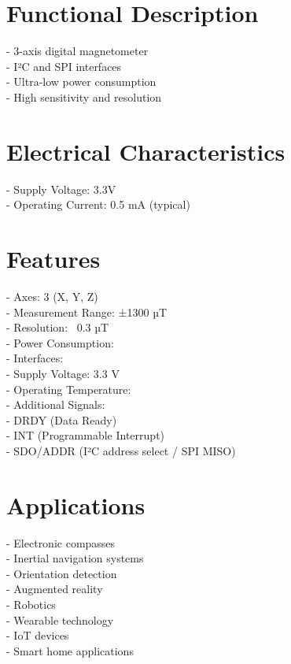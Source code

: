 \documentclass[10pt]{article}
\begin{document}
\section*{Functional Description}
-  3-axis digital magnetometer\\ 
-  I²C and SPI interfaces\\ 
-  Ultra-low power consumption\\ 
-  High sensitivity and resolution\\ 

\section*{Electrical Characteristics}
- Supply Voltage: 3.3V\\ 
- Operating Current: 0.5 mA (typical)\\ 

\section*{Features}
- Axes: 3 (X, Y, Z)\\ 
- Measurement Range: ±1300 µT  \\ 
- Resolution: ~0.3 µT  \\ 
- Power Consumption:  \\ 
- Interfaces:  \\ 
- Supply Voltage: 3.3 V  \\ 
- Operating Temperature:  \\ 
- Additional Signals:  \\ 
    - DRDY (Data Ready)  \\ 
    - INT (Programmable Interrupt)  \\ 
    - SDO/ADDR (I²C address select / SPI MISO)\\ 



\section*{Applications}
- Electronic compasses\\ 
- Inertial navigation systems\\ 
- Orientation detection\\ 
- Augmented reality\\ 
- Robotics\\ 
- Wearable technology\\ 
- IoT devices\\ 
- Smart home applications\\ 
\end{document}
